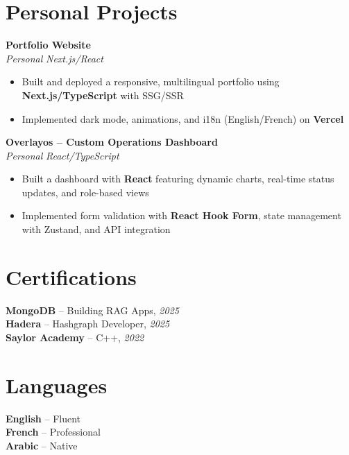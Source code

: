 \documentclass[10pt,a4paper]{article}
\begin{document}
\vspace{4pt}
\section*{Personal Projects}
{\small
\textbf{Portfolio Website}\\[1pt]
\textit{Personal} \hfill \textit{Next.js/React}
\begin{itemize}
  \item Built and deployed a responsive, multilingual portfolio using \textbf{Next.js/TypeScript} with SSG/SSR
  \item Implemented dark mode, animations, and i18n (English/French) on \textbf{Vercel}
\end{itemize}

\vspace{2pt}
\textbf{Overlayos -- Custom Operations Dashboard}\\[1pt]
\textit{Personal} \hfill \textit{React/TypeScript}
\begin{itemize}
  \item Built a dashboard with \textbf{React} featuring dynamic charts, real-time status updates, and role-based views
  \item Implemented form validation with \textbf{React Hook Form}, state management with Zustand, and API integration
\end{itemize}
}

\vspace{3pt}
\section*{Certifications}
{\small
\textbf{MongoDB} -- Building RAG Apps, \textit{2025}\\[1pt]
\textbf{Hadera} -- Hashgraph Developer, \textit{2025}\\[1pt]
\textbf{Saylor Academy} -- C++, \textit{2022}
}

\section*{Languages}
{\small
\textbf{English} -- Fluent\\[1pt]
\textbf{French} -- Professional\\[1pt]
\textbf{Arabic} -- Native
}
\end{document}
